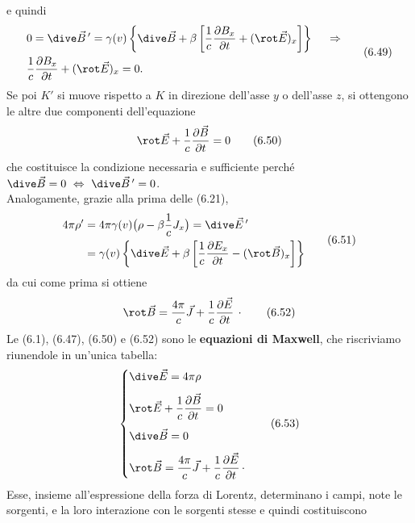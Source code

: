 e quindi
\begin{equation}
  \begin{aligned}
    &0=\dive\vec B\,'=\gamma(v)\left\{\dive\vec B
    +\beta\left[\frac{1}{c}\frac{\partial B_x}{\partial t}+(\rot\vec E)_x\right]
    \right\}\quad\ \Rightarrow\\
    &\frac{1}{c}\frac{\partial B_x}{\partial t}+(\rot\vec E)_x=0.
  \end{aligned}
  \tag{6.49}
\end{equation}
Se poi $K'$ si muove rispetto a $K$ in direzione dell'asse $y$ o dell'asse $z$,
si ottengono le altre due componenti dell'equazione
\begin{equation}
  \rot\vec E+\frac{1}{c}\frac{\partial\vec B}{\partial t}=0
  \tag{6.50}
\end{equation}
che costituisce la condizione necessaria e sufficiente perch\'e
\ $\dive\vec B=0\ \Leftrightarrow\ \dive\vec B\,'=0$.\\
Analogamente, grazie alla prima delle (6.21),
\begin{equation}
  \begin{aligned}
    4\pi\rho'&=4\pi\gamma(v)\big(\rho-\beta\frac{1}{c}J_x\big)=\dive\vec E\,'\\
    &=\gamma(v)\left\{\dive\vec E
    +\beta\left[\frac{1}{c}\frac{\partial E_x}{\partial t}
    -(\rot\vec B)_x\right]\right\}
  \end{aligned}
  \tag{6.51}
\end{equation}
da cui come prima si ottiene
\begin{equation}
  \rot\vec B=\frac{4\pi}{c}\vec J
  +\frac{1}{c}\frac{\partial\vec E}{\partial t}\,\cdot
  \tag{6.52}
\end{equation}
Le (6.1), (6.47), (6.50) e (6.52) sono le \textbf{equazioni di Maxwell}, che
riscriviamo riunendole in un'unica tabella:
\begin{equation}
  \left\{\begin{aligned}
    &\dive\vec E=4\pi\rho\\[4pt]
    &\rot\vec E+\frac{1}{c}\frac{\partial\vec B}{\partial t}=0\\[4pt]
    &\dive\vec B=0\\[4pt]
    &\rot\vec B=\frac{4\pi}{c}\vec J
    +\frac{1}{c}\frac{\partial\vec E}{\partial t}\,\cdot
  \end{aligned}\right.
  \tag{6.53}
\end{equation}
Esse, insieme all'espressione della forza di Lorentz, determinano i campi, note
le sorgenti, e la loro interazione con le sorgenti stesse e quindi costituiscono

